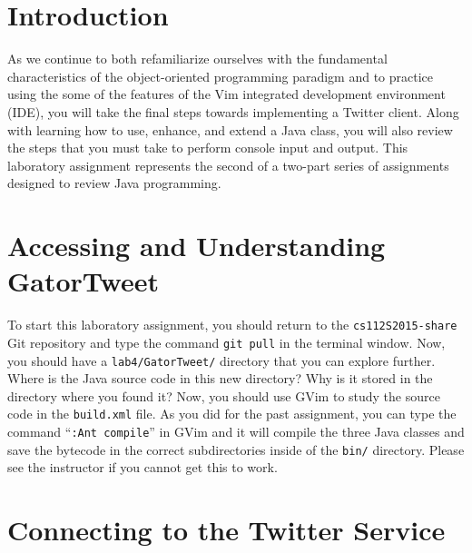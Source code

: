 


\usepackage[compact]{titlesec}



\section*{Introduction}

As we continue to both refamiliarize ourselves with the fundamental characteristics of the object-oriented programming
paradigm and to practice using the some of the features of the Vim integrated development environment (IDE), you will
take the final steps towards implementing a Twitter client.  Along with learning how to use, enhance, and
extend a Java class, you will also review the steps that you must take to perform console input and output. This
laboratory assignment represents the second of a two-part series of assignments designed to review Java programming.

\section*{Accessing and Understanding GatorTweet}

To start this laboratory assignment, you should return to the {\tt cs112S2015-share} Git repository and type the command
{\tt git pull} in the terminal window.  Now, you should have a {\tt lab4/GatorTweet/} directory that you can explore
further.  Where is the Java source code in this new directory? Why is it stored in the directory where you found it?
Now, you should use GVim to study the source code in the {\tt build.xml} file.  As you did for the past assignment, you
can type the command ``{\tt :Ant compile}'' in GVim and it will compile the three Java classes and save the bytecode in
the correct subdirectories inside of the {\tt bin/} directory.  Please see the instructor if you cannot get this to
work.

\section*{Connecting to the Twitter Service}

